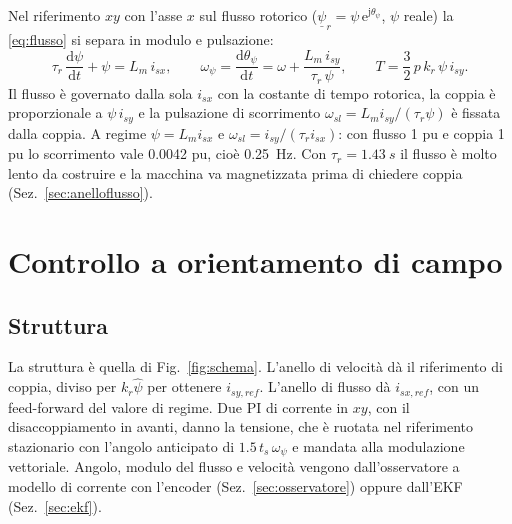 \documentclass[10pt,a4paper]{scrartcl}
\newcommand{\jj}{\mathrm{j}}
\newcommand{\ee}{\mathrm{e}}
\newcommand{\dif}{\mathrm{d}}
\newcommand{\ts}{t_s}
\newcommand{\psv}{\underline{\psi}_r}
\newcommand{\kr}{k_r}
\newcommand{\taur}{\tau_r}
\begin{document}
\begin{onehalfspace}
Nel riferimento $xy$ con l'asse $x$ sul flusso rotorico ($\psv = \psi\,\ee^{\jj\theta_\psi}$, $\psi$ reale) la \eqref{eq:flusso} si separa in modulo e pulsazione:
\begin{equation}
\taur\,\frac{\dif\psi}{\dif t} + \psi = L_m\,i_{sx}, \qquad \omega_\psi = \frac{\dif\theta_\psi}{\dif t} = \omega + \frac{L_m\,i_{sy}}{\taur\,\psi}, \qquad T = \frac32\,p\,\kr\,\psi\,i_{sy}.
\label{eq:foc}
\end{equation}
Il flusso è governato dalla sola $i_{sx}$ con la costante di tempo rotorica, la coppia è proporzionale a $\psi\,i_{sy}$ e la pulsazione di scorrimento $\omega_{sl} = L_m i_{sy}/(\taur\psi)$ è fissata dalla coppia. A regime $\psi = L_m i_{sx}$ e $\omega_{sl} = i_{sy}/(\taur i_{sx})$: con flusso 1 pu e coppia 1 pu lo scorrimento vale \num{0.0042} pu, cioè \SI{0.25}{Hz}. Con $\taur = \SI{1.43}{s}$ il flusso è molto lento da costruire e la macchina va magnetizzata prima di chiedere coppia (Sez.~\ref{sec:anelloflusso}).

\section{Controllo a orientamento di campo}
\label{sec:foc}

\subsection{Struttura}
\label{sec:struttura}

La struttura è quella di Fig.~\ref{fig:schema}. L'anello di velocità dà il riferimento di coppia, diviso per $\kr\hat\psi$ per ottenere $i_{sy,ref}$. L'anello di flusso dà $i_{sx,ref}$, con un feed-forward del valore di regime. Due PI di corrente in $xy$, con il disaccoppiamento in avanti, danno la tensione, che è ruotata nel riferimento stazionario con l'angolo anticipato di $1.5\,\ts\,\omega_\psi$ e mandata alla modulazione vettoriale. Angolo, modulo del flusso e velocità vengono dall'osservatore a modello di corrente con l'encoder (Sez.~\ref{sec:osservatore}) oppure dall'EKF (Sez.~\ref{sec:ekf}).


\end{onehalfspace}
\end{document}
